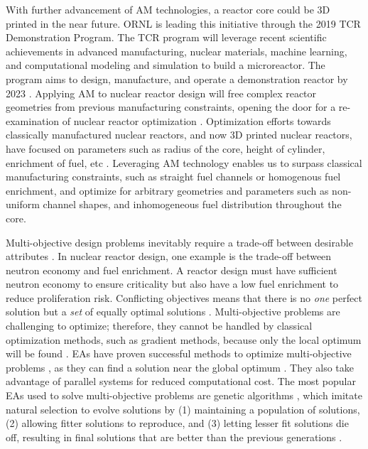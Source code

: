 With further advancement of \gls{AM} technologies, a reactor 
core could be 3D printed in the near future. 
\gls{ORNL} is leading this initiative through the 2019 \gls{TCR} Demonstration 
Program. 
The \gls{TCR} program will leverage recent scientific achievements in advanced 
manufacturing, nuclear materials, machine learning, and computational modeling 
and simulation to build a microreactor. 
The program aims to design, manufacture, and operate a demonstration reactor 
by 2023 \cite{terrani_transformational_2019}. 
Applying \gls{AM} to nuclear reactor design will free complex 
reactor geometries from previous manufacturing constraints,
opening the door for a re-examination of nuclear reactor optimization 
\cite{sobes_artificial_2020}. 
Optimization efforts towards classically manufactured nuclear reactors, and now
3D printed nuclear reactors, have focused on parameters such as radius of the 
core, height of cylinder, enrichment of fuel, etc 
\cite{sobes_artificial_2020,sacco_two_2006,kumar_new_2015,pereira_parallel_2008}. 
Leveraging \gls{AM} technology enables us to surpass classical 
manufacturing constraints, such as straight fuel channels or homogenous fuel 
enrichment, and optimize for arbitrary geometries and parameters 
such as non-uniform channel shapes, and inhomogeneous fuel distribution throughout 
the core. 

Multi-objective design problems inevitably require a trade-off between 
desirable attributes \cite{byrne_evolving_2014,simon_sciences_2019}. 
In nuclear reactor design, one example is the trade-off between neutron economy 
and fuel enrichment.
A reactor design must have sufficient neutron economy to ensure criticality but 
also have a low fuel enrichment to reduce proliferation risk. 
Conflicting objectives means that there is no \textit{one} perfect solution but 
a \textit{set} of equally optimal solutions \cite{byrne_evolving_2014}.
Multi-objective problems are challenging to optimize; therefore, they cannot be 
handled by classical optimization methods, such as gradient methods, because only 
the local optimum will be found \cite{renner_genetic_2003}. 
\Glspl{EA} have proven successful methods to optimize 
multi-objective problems \cite{krish_practical_2011}, as 
they can find a solution near the global optimum \cite{renner_genetic_2003}.
They also take advantage of parallel systems for reduced computational cost.
The most popular \glspl{EA} used to solve multi-objective 
problems are genetic algorithms \cite{byrne_evolving_2014, krish_practical_2011},
which imitate natural selection to evolve solutions by (1) maintaining a 
population of solutions, (2) allowing fitter solutions to reproduce, and (3) 
letting lesser fit solutions die off, resulting in final solutions that are 
better than the previous generations \cite{renner_genetic_2003}. 

